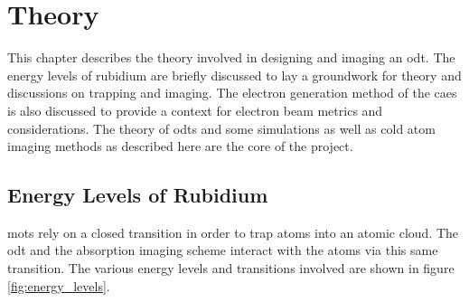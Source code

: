 \chapter{Theory}

This chapter describes the theory involved in designing and imaging an \gls{odt}. The energy levels of rubidium are briefly discussed to lay a groundwork for theory and discussions on trapping and imaging. The electron generation method of the \gls{caes} is also discussed to provide a context for electron beam metrics and considerations. The theory of \glspl{odt} and some simulations as well as cold atom imaging methods as described here are the core of the project.

\section{Energy Levels of Rubidium}

\Glspl{mot} rely on a closed transition in order to trap atoms into an atomic cloud. The \Gls{odt} and the absorption imaging scheme interact with the atoms via this same transition. The various energy levels and transitions involved are shown in figure \ref{fig:energy_levels}.

